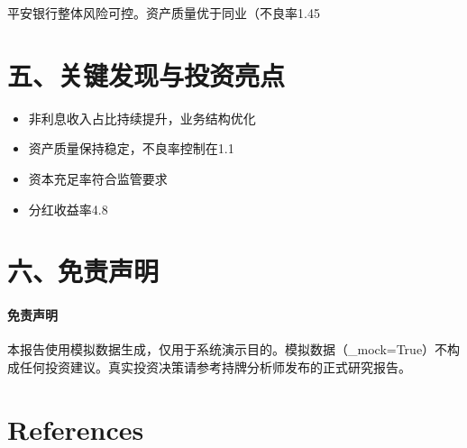 \documentclass[12pt,a4paper]{article}
\begin{document}
平安银行整体风险可控。资产质量优于同业（不良率1.45%

\section{五、关键发现与投资亮点}
\begin{itemize}
\item 非利息收入占比持续提升，业务结构优化
\item 资产质量保持稳定，不良率控制在1.1%
\item 资本充足率符合监管要求
\item 分红收益率4.8%
\end{itemize}

\section{六、免责声明}
\paragraph*{{免责声明}} 本报告使用模拟数据生成，仅用于系统演示目的。模拟数据（\_mock=True）不构成任何投资建议。真实投资决策请参考持牌分析师发布的正式研究报告。

\newpage
\section*{References}

\newpage
\appendix
\end{document}
